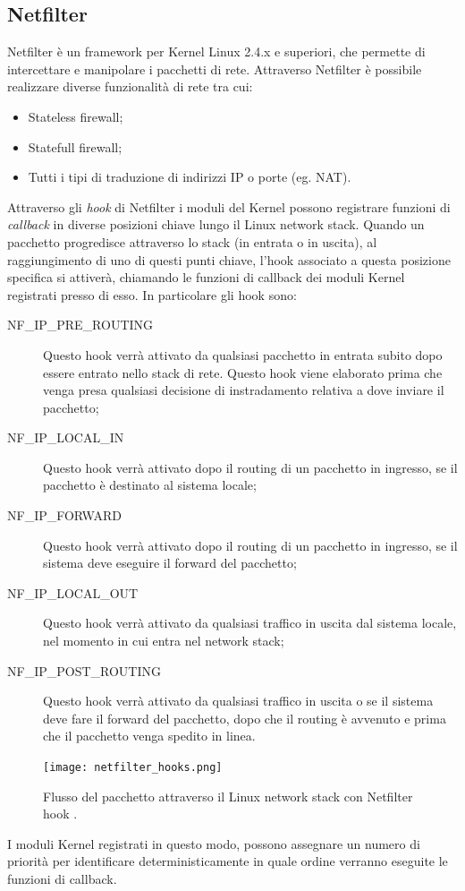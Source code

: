 \subsection{Netfilter}
\label{netfilter}
Netfilter \cite{netfilter,netfilterAndIptables} è un framework per Kernel Linux 2.4.x e superiori, che permette di intercettare e manipolare i pacchetti di rete. Attraverso Netfilter è possibile realizzare diverse funzionalità di rete tra cui:
\begin{itemize}
    \item Stateless firewall;
    \item Statefull firewall;
    \item Tutti i tipi di traduzione di indirizzi IP o porte (eg. NAT).
\end{itemize}
Attraverso gli \textit{hook} di Netfilter i moduli del Kernel possono registrare funzioni di \textit{callback} in diverse posizioni chiave lungo il Linux network stack. Quando un pacchetto progredisce attraverso lo stack  (in entrata o in uscita), al raggiungimento di uno di questi punti chiave, l'hook associato a questa posizione specifica si attiverà, chiamando le funzioni di  callback dei moduli Kernel registrati presso di esso.
In particolare gli hook sono:
\begin{description}
    \item[NF\_IP\_PRE\_ROUTING] Questo hook verrà attivato da qualsiasi pacchetto in entrata subito dopo essere entrato nello stack di rete. Questo hook viene elaborato prima che venga presa qualsiasi decisione di instradamento relativa a dove inviare il pacchetto;
    \item[NF\_IP\_LOCAL\_IN] Questo hook verrà attivato dopo il routing di un pacchetto in ingresso, se il pacchetto è destinato al sistema locale;
    \item[NF\_IP\_FORWARD] Questo hook verrà attivato dopo il routing di un pacchetto in ingresso, se il sistema deve eseguire il forward del pacchetto;
    \item[NF\_IP\_LOCAL\_OUT]  Questo hook verrà attivato da qualsiasi traffico in uscita dal sistema locale, nel momento in cui entra nel network stack;
    \item[NF\_IP\_POST\_ROUTING] Questo hook verrà attivato da qualsiasi traffico in uscita o se il sistema deve fare il forward del pacchetto, dopo che il routing è avvenuto e prima che il pacchetto venga spedito in linea.
\end{description}
\begin{figure}[hbtp]
    \centering
    \texttt{[image: netfilter\_hooks.png]}
    \caption{Flusso del pacchetto attraverso il Linux network stack con Netfilter hook \cite{NetfilterHooks}.}
    \label{fig:netfilter_hooks}
\end{figure}
I moduli Kernel registrati in questo modo, possono assegnare un numero di priorità per identificare deterministicamente in quale ordine verranno eseguite le funzioni di callback.

